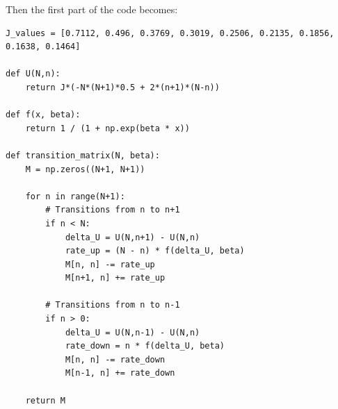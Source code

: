 Then the first part of the code becomes:
\begin{lstlisting}[style=mypython, caption={\centering Functions defined for the All-To-All model in order to find the analytical solutions for $p_n(t)$}]
J_values = [0.7112, 0.496, 0.3769, 0.3019, 0.2506, 0.2135, 0.1856, 0.1638, 0.1464]

def U(N,n):
    return J*(-N*(N+1)*0.5 + 2*(n+1)*(N-n)) 

def f(x, beta):
    return 1 / (1 + np.exp(beta * x))

def transition_matrix(N, beta):
    M = np.zeros((N+1, N+1))

    for n in range(N+1):
        # Transitions from n to n+1
        if n < N:
            delta_U = U(N,n+1) - U(N,n)
            rate_up = (N - n) * f(delta_U, beta)
            M[n, n] -= rate_up
            M[n+1, n] += rate_up

        # Transitions from n to n-1
        if n > 0:
            delta_U = U(N,n-1) - U(N,n)
            rate_down = n * f(delta_U, beta)
            M[n, n] -= rate_down
            M[n-1, n] += rate_down

    return M

\end{lstlisting}